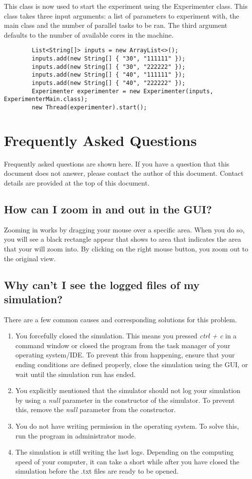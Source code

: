 \documentclass{article}
\begin{document}
This class is now used to start the experiment using the Experimenter class. This class takes three input arguments: a list of parameters to experiment with, the main class and the number of parallel tasks to be ran. The third argument defaults to the number of available cores in the machine.

\begin{verbatim}
		List<String[]> inputs = new ArrayList<>();
		inputs.add(new String[] { "30", "111111" });
		inputs.add(new String[] { "30", "222222" });
		inputs.add(new String[] { "40", "111111" });
		inputs.add(new String[] { "40", "222222" });
		Experimenter experimenter = new Experimenter(inputs, ExperimenterMain.class);
		new Thread(experimenter).start();
\end{verbatim}

\section{Frequently Asked Questions} \label{sec:faq}
Frequently asked questions are shown here. If you have a question that this document does not answer, please contact the author of this document. Contact details are provided at the top of this document. 

\subsection*{How can I zoom in and out in the GUI?}
Zooming in works by dragging your mouse over a specific area. When you do so, you will see a black rectangle appear that shows to area that indicates the area that your will zoom into. By clicking on the right mouse button, you zoom out to the original view.

\subsection*{Why can't I see the logged files of my simulation?}
There are a few common causes and corresponding solutions for this problem. 
\begin{enumerate}
    \item You forcefully closed the simulation. This means you pressed \textit{ctrl + c} in a command window or closed the program from the task manager of your operating system/IDE. To prevent this from happening, ensure that your ending conditions are defined properly, close the simulation using the GUI, or wait until the simulation run has ended.
    \item You explicitly mentioned that the simulator should not log your simulation by using a \textit{null} parameter in the constructor of the simulator. To prevent this, remove the \textit{null} parameter from the constructor.
    \item You do not have writing permission in the operating system. To solve this, run the program in administrator mode.
    \item The simulation is still writing the last logs. Depending on the computing speed of your computer, it can take a short while after you have closed the simulation before the .txt files are ready to be opened.
\end{enumerate}
\end{document}

